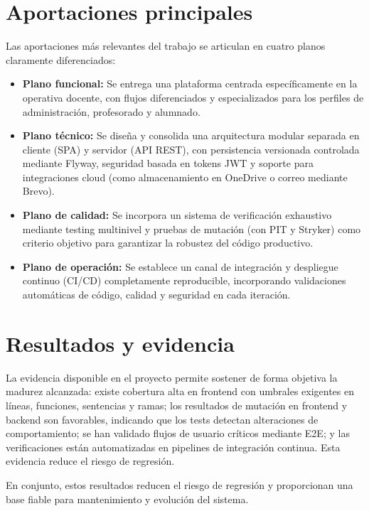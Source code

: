 \FloatBarrier
\section{Aportaciones principales}

Las aportaciones m\'as relevantes del trabajo se articulan en cuatro planos claramente diferenciados:

\begin{itemize}
    \item \textbf{Plano funcional:} Se entrega una plataforma centrada espec\'ificamente en la operativa docente, con flujos diferenciados y especializados para los perfiles de administraci\'on, profesorado y alumnado.
    \item \textbf{Plano t\'ecnico:} Se dise\~na y consolida una arquitectura modular separada en cliente (SPA) y servidor (API REST), con persistencia versionada controlada mediante Flyway, seguridad basada en tokens JWT y soporte para integraciones cloud (como almacenamiento en OneDrive o correo mediante Brevo).
    \item \textbf{Plano de calidad:} Se incorpora un sistema de verificaci\'on exhaustivo mediante testing multinivel y pruebas de mutaci\'on (con PIT y Stryker) como criterio objetivo para garantizar la robustez del c\'odigo productivo.
    \item \textbf{Plano de operaci\'on:} Se establece un canal de integraci\'on y despliegue continuo (CI/CD) completamente reproducible, incorporando validaciones autom\'aticas de c\'odigo, calidad y seguridad en cada iteraci\'on.
\end{itemize}

\FloatBarrier
\section{Resultados y evidencia}

La evidencia disponible en el proyecto permite sostener de forma objetiva la madurez alcanzada: existe cobertura alta en frontend con umbrales exigentes en l\'ineas, funciones, sentencias y ramas; los resultados de mutaci\'on en frontend y backend son favorables, indicando que los tests detectan alteraciones de comportamiento; se han validado flujos de usuario cr\'iticos mediante E2E; y las verificaciones est\'an automatizadas en pipelines de integraci\'on continua. Esta evidencia reduce el riesgo de regresi\'on.

En conjunto, estos resultados reducen el riesgo de regresi\'on y
proporcionan una base fiable para mantenimiento y evoluci\'on del sistema.

